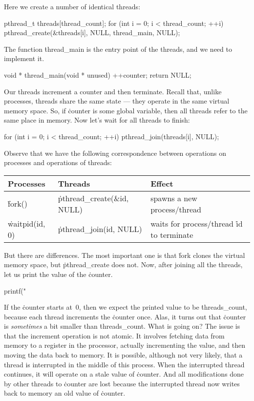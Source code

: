 Here we create a number of identical threads:
\begin{ccode}
pthread_t threads[thread_count];
for (int i = 0; i < thread_count; ++i) {
  pthread_create(&threads[i], NULL, thread_main, NULL);
}
\end{ccode}
The function \.{thread\_main} is the entry point of the threads,
  and we need to implement it.
\begin{ccode}
void * thread_main(void * unused) { ++counter; return NULL; }
\end{ccode}
Our threads increment a counter and then terminate.
Recall that, unlike processes, threads share the same state ---
  they operate in the same virtual memory space.
So, if \.{counter} is some global variable,
  then all threads refer to the same place in memory.
Now let's wait for all threads to finish:
\begin{ccode}
for (int i = 0; i < thread_count; ++i) {
  pthread_join(threads[i], NULL);
}
\end{ccode}
Observe that we have the following correspondence
  between operations on processes and operations of threads:
\begin{center}
\begin{tabular}{@{}lll@{}}
\toprule
{\bf Processes} & {\bf Threads} & {\bf Effect} \\
\midrule
\.{fork()} & \.{pthread\_create(\&id, NULL)}
  & spawns a new process\slash thread \\
\.{waitpid(id, 0)} & \.{pthread\_join(id, NULL)}
  & waits for process\slash thread \.{id} to terminate \\
\bottomrule
\end{tabular}
\end{center}
But there are differences.
The most important one is that
  \.{fork} clones the virtual memory space, but \.{pthread\_create} does not.
Now, after joining all the threads, let us print the value of the \.{counter}.
\begin{ccode}
printf("%
\end{ccode}
If the \.{counter} starts at~$0$,
  then we expect the printed value to be \.{threads\_count},
  because each thread increments the \.{counter} once.
Alas, it turns out that
  \.{counter} is \emph{sometimes} a bit smaller than \.{threads\_count}.
What is going on?
The issue is that the increment operation is not atomic.
It involves fetching data from memory to a register in the processor,
  actually incrementing the value,
  and then moving the data back to memory.
It is possible, although not very likely,
  that a thread is interrupted in the middle of this process.
When the interrupted thread continues,
  it will operate on a stale value of \.{counter}.
And all modifications done by other threads to \.{counter} are lost
  because the interrupted thread now writes back to memory
    an old value of \.{counter}.

